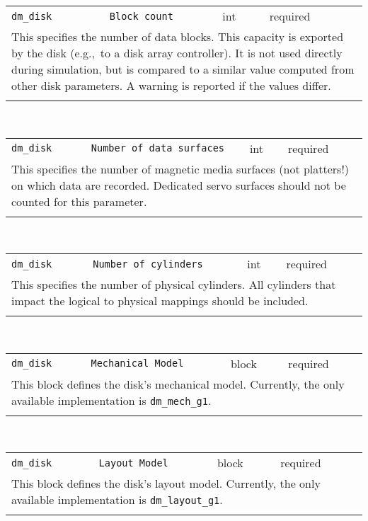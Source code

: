 \noindent 
\begin{tabular}{|p{1.5in}|p{3.5in}|p{0.5in}|p{0.5in}|}
\cline{1-4}
\texttt{dm\_disk} & \texttt{Block count} & int & required \\ 
\cline{1-4}
\multicolumn{4}{|p{6in}|}{
This specifies the number of data blocks. This capacity is exported by the
disk (e.g.,~to a disk array controller). It is not used directly
during simulation, but is compared to a similar value computed from
other disk parameters. A warning is reported if the values differ.
}\\ 
\cline{1-4}
\multicolumn{4}{p{5in}}{}\\
\end{tabular}\\ 
\noindent 
\begin{tabular}{|p{1.5in}|p{3.5in}|p{0.5in}|p{0.5in}|}
\cline{1-4}
\texttt{dm\_disk} & \texttt{Number of data surfaces} & int & required \\ 
\cline{1-4}
\multicolumn{4}{|p{6in}|}{
This specifies the number of magnetic media surfaces (not platters!) on
which data are recorded. Dedicated servo surfaces should not be
counted for this parameter.
}\\ 
\cline{1-4}
\multicolumn{4}{p{5in}}{}\\
\end{tabular}\\ 
\noindent 
\begin{tabular}{|p{1.5in}|p{3.5in}|p{0.5in}|p{0.5in}|}
\cline{1-4}
\texttt{dm\_disk} & \texttt{Number of cylinders} & int & required \\ 
\cline{1-4}
\multicolumn{4}{|p{6in}|}{
This specifies the number of physical cylinders. All cylinders that impact
the logical to physical mappings should be included.
}\\ 
\cline{1-4}
\multicolumn{4}{p{5in}}{}\\
\end{tabular}\\ 
\noindent 
\begin{tabular}{|p{1.5in}|p{3.5in}|p{0.5in}|p{0.5in}|}
\cline{1-4}
\texttt{dm\_disk} & \texttt{Mechanical Model} & block & required \\ 
\cline{1-4}
\multicolumn{4}{|p{6in}|}{
This block defines the disk's mechanical model. Currently,
the only available implementation is \texttt{dm\_mech\_g1}.
}\\ 
\cline{1-4}
\multicolumn{4}{p{5in}}{}\\
\end{tabular}\\ 
\noindent 
\begin{tabular}{|p{1.5in}|p{3.5in}|p{0.5in}|p{0.5in}|}
\cline{1-4}
\texttt{dm\_disk} & \texttt{Layout Model} & block & required \\ 
\cline{1-4}
\multicolumn{4}{|p{6in}|}{
This block defines the disk's layout model. Currently,
the only available implementation is \texttt{dm\_layout\_g1}.
}\\ 
\cline{1-4}
\multicolumn{4}{p{5in}}{}\\
\end{tabular}\\ 
